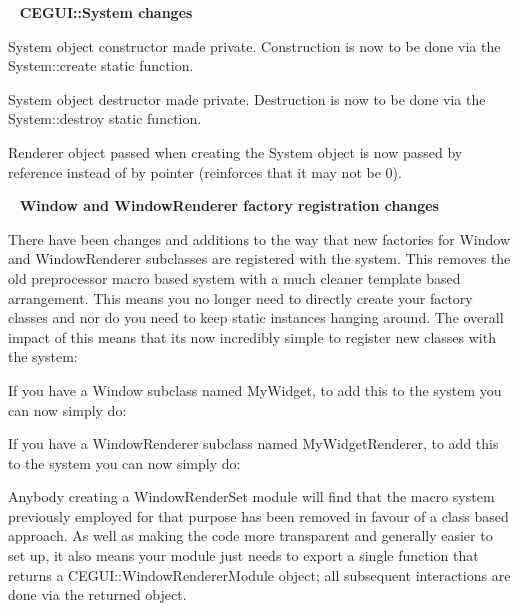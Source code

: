 ~\newline
 {\bfseries{C\+E\+G\+U\+I\+::\+System changes}}
\begin{DoxyItemize}
\item System object constructor made private. Construction is now to be done via the System\+::create static function.
\item System object destructor made private. Destruction is now to be done via the System\+::destroy static function.
\item Renderer object passed when creating the System object is now passed by reference instead of by pointer (reinforces that it may not be 0).
\end{DoxyItemize}

~\newline
 {\bfseries{Window and Window\+Renderer factory registration changes}}
\begin{DoxyItemize}
\item There have been changes and additions to the way that new factories for Window and Window\+Renderer subclasses are registered with the system. This removes the old preprocessor macro based system with a much cleaner template based arrangement. This means you no longer need to directly create your factory classes and nor do you need to keep static instances hanging around. The overall impact of this means that it\textquotesingle{}s now incredibly simple to register new classes with the system\+:
\begin{DoxyItemize}
\item If you have a Window subclass named \textquotesingle{}My\+Widget, to add this to the system you can now simply do\+: 
\begin{DoxyCode}{0}
\end{DoxyCode}

\item If you have a Window\+Renderer subclass named \textquotesingle{}My\+Widget\+Renderer\textquotesingle{}, to add this to the system you can now simply do\+: 
\begin{DoxyCode}{0}
\end{DoxyCode}

\item Anybody creating a Window\+Render\+Set module will find that the macro system previously employed for that purpose has been removed in favour of a class based approach. As well as making the code more transparent and generally easier to set up, it also means your module just needs to export a single function that returns a C\+E\+G\+U\+I\+::\+Window\+Renderer\+Module object; all subsequent interactions are done via the returned object.
\end{DoxyItemize}
\end{DoxyItemize}

